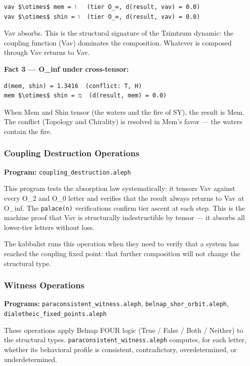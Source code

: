 \documentclass[12pt,a4paper]{article}
\begin{document}
\begin{lstlisting}
vav $\otimes$ mem = ו   (tier O_∞, d(result, vav) = 0.0)
vav $\otimes$ shin = ו  (tier O_∞, d(result, vav) = 0.0)
\end{lstlisting}

Vav absorbs. This is the structural signature of the Tzimtzum dynamic: the coupling function (Vav) dominates the composition. Whatever is composed through Vav returns to Vav.

\textbf{Fact 3 --- O\_inf under cross-tensor:}

\begin{lstlisting}
d(mem, shin) = 1.3416  (conflict: T, H)
mem $\otimes$ shin = מ  (d(result, mem) = 0.0)
\end{lstlisting}

When Mem and Shin tensor (the waters and the fire of SY), the result is Mem. The conflict (Topology and Chirality) is resolved in Mem's favor --- the waters contain the fire.

\subsubsection{Coupling Destruction Operations}

\textbf{Program:} \texttt{coupling\_\allowbreak destruction.\allowbreak aleph}

This program tests the absorption law systematically: it tensors Vav against every O\_2 and O\_0 letter and verifies that the result always returns to Vav at O\_inf. The \texttt{palace(n)} verifications confirm tier ascent at each step. This is the machine proof that Vav is structurally indestructible by tensor --- it absorbs all lower-tier letters without loss.

The kabbalist runs this operation when they need to verify that a system has reached the coupling fixed point: that further composition will not change the structural type.

\subsubsection{Witness Operations}

\textbf{Programs:} \texttt{paraconsistent\_\allowbreak witness.\allowbreak aleph}, \texttt{belnap\_\allowbreak shor\_\allowbreak orbit.\allowbreak aleph}, \texttt{dialetheic\_\allowbreak fixed\_\allowbreak points.\allowbreak aleph}

These operations apply Belnap FOUR logic (True / False / Both / Neither) to the structural types. \texttt{paraconsistent\_\allowbreak witness.\allowbreak aleph} computes, for each letter, whether its behavioral profile is consistent, contradictory, overdetermined, or underdetermined.
\end{document}
